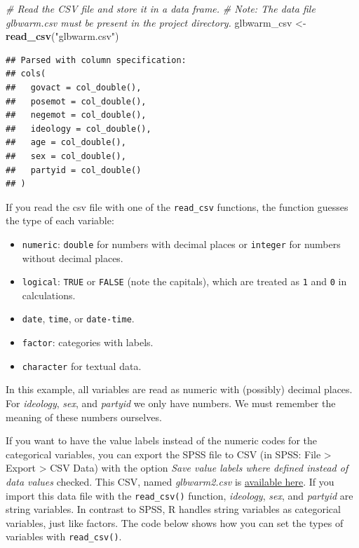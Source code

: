\documentclass[doc,floatsintext]{apa6}
\newenvironment{Shaded}{\begin{snugshade}}{\end{snugshade}}
\newcommand{\KeywordTok}[1]{\textcolor[rgb]{0.13,0.29,0.53}{\textbf{#1}}}
\newcommand{\StringTok}[1]{\textcolor[rgb]{0.31,0.60,0.02}{#1}}
\newcommand{\CommentTok}[1]{\textcolor[rgb]{0.56,0.35,0.01}{\textit{#1}}}
\newcommand{\NormalTok}[1]{#1}
\providecommand{\tightlist}{%
  \setlength{\itemsep}{0pt}\setlength{\parskip}{0pt}}
\begin{document}
\begin{Shaded}
\begin{Highlighting}[]
\CommentTok{# Read the CSV file and store it in a data frame.}
\CommentTok{# Note: The data file glbwarm.csv must be present in the project directory.}
\NormalTok{glbwarm_csv <-}\StringTok{ }\KeywordTok{read_csv}\NormalTok{(}\StringTok{"glbwarm.csv"}\NormalTok{)}
\end{Highlighting}
\end{Shaded}

\begin{verbatim}
## Parsed with column specification:
## cols(
##   govact = col_double(),
##   posemot = col_double(),
##   negemot = col_double(),
##   ideology = col_double(),
##   age = col_double(),
##   sex = col_double(),
##   partyid = col_double()
## )
\end{verbatim}

If you read the csv file with one of the \texttt{read\_csv} functions,
the function guesses the type of each variable:

\begin{itemize}
\tightlist
\item
  \texttt{numeric}: \texttt{double} for numbers with decimal places or
  \texttt{integer} for numbers without decimal places.
\item
  \texttt{logical}: \texttt{TRUE} or \texttt{FALSE} (note the capitals),
  which are treated as \texttt{1} and \texttt{0} in calculations.
\item
  \texttt{date}, \texttt{time}, or \texttt{date-time}.
\item
  \texttt{factor}: categories with labels.
\item
  \texttt{character} for textual data.
\end{itemize}

In this example, all variables are read as numeric with (possibly)
decimal places. For \emph{ideology}, \emph{sex}, and \emph{partyid} we
only have numbers. We must remember the meaning of these numbers
ourselves.

If you want to have the value labels instead of the numeric codes for
the categorical variables, you can export the SPSS file to CSV (in SPSS:
File \textgreater{} Export \textgreater{} CSV Data) with the option
\emph{Save value labels where defined instead of data values} checked.
This CSV, named \emph{glbwarm2.csv} is
\href{https://wdenooy.github.io/Switch2R/glbwarm2.csv}{available here}.
If you import this data file with the \texttt{read\_csv()} function,
\emph{ideology}, \emph{sex}, and \emph{partyid} are string variables. In
contrast to SPSS, R handles string variables as categorical variables,
just like factors. The code below shows how you can set the types of
variables with \texttt{read\_csv()}.
\end{document}
